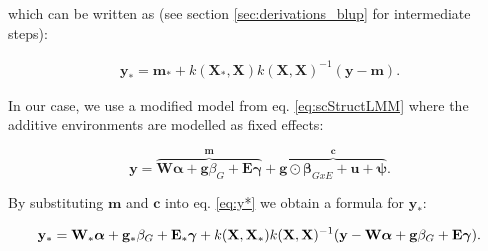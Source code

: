 which can be written as (see section \ref{sec:derivations_blup} for intermediate steps):

\begin{align}\label{eq:y*}
\mathbf{y}_* = \mathbf{m}_* + k(\mathbf{X}_*,\mathbf{X})k(\mathbf{X},\mathbf{X})^{-1}(\mathbf{y}-\mathbf{m}).
\end{align}



In our case, we use a modified model from eq. \eqref{eq:scStructLMM} where the additive environments are modelled as fixed effects: 

\begin{equation}\label{eq:scStructLMM_E_as_FE}
    \mathbf{y} = \overbrace{\mathbf{W}\boldsymbol{\alpha} + \mathbf{g}\beta_G + \mathbf{E}\boldsymbol{\gamma}}^{\mathbf{m}} + \overbrace{\mathbf{g} \odot \boldsymbol{\beta}_{GxE}+ \mathbf{u} + \boldsymbol{\psi}}^{\mathbf{c}}.
\end{equation}


By substituting $\mathbf{m}$ and $\mathbf{c}$ into eq. \eqref{eq:y*} we obtain a formula for $\mathbf{y}_*$:

\begin{equation}\label{eq:y*_expanded}
    \mathbf{y}_* = \mathbf{W}_*\boldsymbol{\alpha} + \mathbf{g}_* \beta_G + \mathbf{E}_* \boldsymbol{\gamma} + k(\mathbf{X},\mathbf{X}_*) k(\mathbf{X},\mathbf{X})^{-1} (\mathbf{y}-\mathbf{W}\boldsymbol{\alpha} + \mathbf{g} \beta_G + \mathbf{E} \boldsymbol{\gamma}).
\end{equation}



